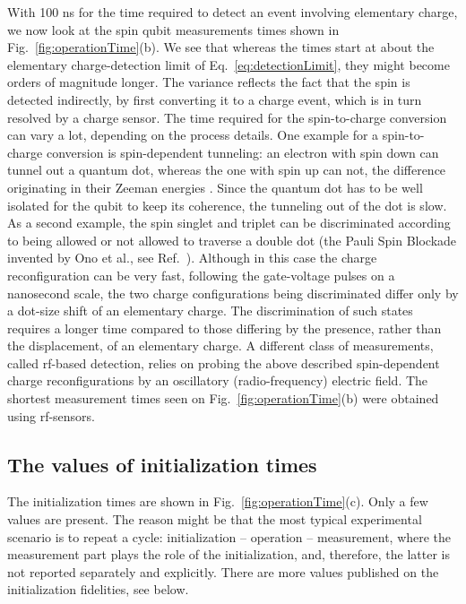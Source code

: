 \documentclass[aps, prx, showpacs, twocolumn, superscriptaddress, notitlepage, longbibliography, floatfix, nofootinbib]{revtex4-2}
\newcommand{\recheck}[1]{{#1}}
\begin{document}
With 100 ns for the time required to detect an event involving elementary charge, we now look at the spin qubit measurements times shown in Fig.~\ref{fig:operationTime}(b). \recheck{We see that whereas the times start at about the elementary charge-detection limit of Eq.~\eqref{eq:detectionLimit}, they might become orders of magnitude longer.} The variance reflects the fact that the spin is detected indirectly, by first converting it to a charge event, which is in turn resolved by a charge sensor. The time required for the spin-to-charge conversion can vary a lot, depending on the process details. One example for a spin-to-charge conversion is spin-dependent tunneling: an electron with spin down can tunnel out a quantum dot, whereas the one with spin up can not, the difference originating in their Zeeman energies \cite{hanson_zeeman_2003}. Since the quantum dot has to be well isolated for the qubit to keep its coherence, the tunneling out of the dot is slow. As a second example, the spin singlet and triplet can be discriminated according to being allowed or not allowed to traverse a double dot (the Pauli Spin Blockade invented by Ono et al., see Ref.~\cite{ono_current_2002}). Although in this case the charge reconfiguration can be very fast, following the gate-voltage pulses on a nanosecond scale, the two charge configurations being discriminated differ only by a dot-size shift of an elementary charge. The discrimination of such states requires a longer time compared to those differing by the presence, rather than the displacement, of an elementary charge. A different class of measurements, called rf-based detection, relies on probing the above described spin-dependent charge reconfigurations by an oscillatory (radio-frequency) electric field. \recheck{The shortest measurement times seen on Fig.~\ref{fig:operationTime}(b) were obtained using rf-sensors.}

\subsection{The values of initialization times}

The initialization times are shown in Fig.~\ref{fig:operationTime}(c). \recheck{Only a few values are present.} The reason might be that the most typical experimental scenario is to repeat a cycle: initialization -- operation -- measurement, where the measurement part plays the role of the initialization, and, therefore, the latter is not reported separately and explicitly. \recheck{There are more values published on the initialization fidelities, see below.}
\end{document}
